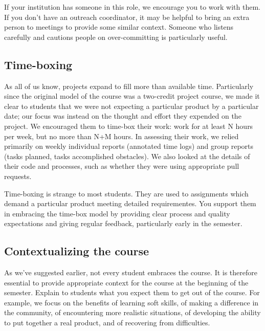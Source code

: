 If your institution has someone in this role, we encourage you to work with
them.  If you don't have an outreach coordinator, it may be helpful to
bring an extra person to meetings to provide some similar context.  Someone
who listens carefully and cautions people on over-committing is particularly
useful.

\subsection{Time-boxing}

As all of us know, projects expand to fill more than available time.
Particularly since the original model of the course was a two-credit
project course, we made it clear to students that we were not expecting
a particular product by a particular date; our focus was instead on the
thought and effort they expended on the project.  We encouraged them
to time-box their work: work for at least N hours per week, but no more
than N+M hours.  In assessing their work, we relied primarily on
weekly individual reports (annotated time logs) and group reports
(tasks planned, tasks accomplished obstacles).  We also looked at the
details of their code and processes, such as whether they were using
appropriate pull requests.

Time-boxing is strange to most students.  They are used to assignments 
which demand a particular
product meeting detailed requirementes.  You support them in embracing the
time-box model by providing clear process and quality expectations and
giving regular feedback, particularly early in the semester.

\subsection{Contextualizing the course}

As we've suggested earlier, not every student embraces the course.  It
is therefore essential to provide appropriate context for the course at
the beginning of the semester.  Explain to students what you expect them
to get out of the course.  For example, we focus on the benefits of learning
soft skills, of making a difference in the community, of encountering
more realistic situations, of developing the ability to put together a
real product, and of recovering from difficulties.
